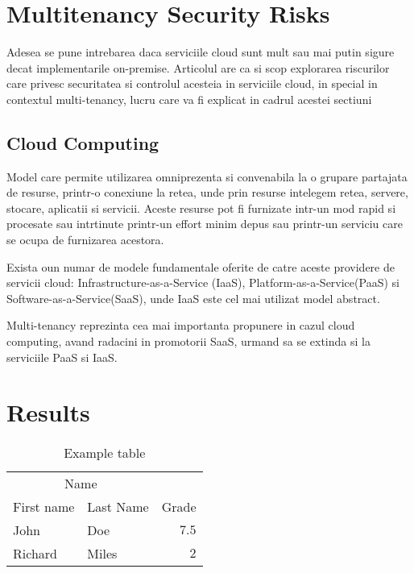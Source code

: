 \documentclass[twoside,twocolumn]{article}
\begin{document}
\begin{enumerate}
\begin{enumerate}
\end{enumerate}
\end{enumerate}

\section{Multitenancy Security Risks}
\par Adesea se pune intrebarea daca serviciile cloud sunt mult sau mai putin sigure decat implementarile on-premise. Articolul \cite{2} are ca si scop explorarea riscurilor care privesc securitatea si controlul acesteia in serviciile cloud, in special in contextul multi-tenancy, lucru care va fi explicat in cadrul acestei sectiuni\\

\subsection{Cloud Computing}
\par Model care permite utilizarea omniprezenta si convenabila la o grupare partajata de resurse, printr-o conexiune la retea, unde prin resurse intelegem retea, servere, stocare, aplicatii si servicii. Aceste resurse pot fi furnizate intr-un mod rapid si procesate sau intrtinute printr-un effort minim depus sau printr-un serviciu care se ocupa de furnizarea acestora. \\
\par Exista oun numar de modele fundamentale oferite de catre aceste providere de servicii cloud: Infrastructure-as-a-Service (IaaS), Platform-as-a-Service(PaaS) si Software-as-a-Service(SaaS), unde IaaS este cel mai utilizat model abstract.\\
\par Multi-tenancy reprezinta cea mai importanta propunere in cazul cloud computing, avand radacini in promotorii SaaS, urmand sa se extinda si la serviciile PaaS si IaaS.\\




\section{Results}

\begin{table}
\caption{Example table}
\centering
\begin{tabular}{llr}
\toprule
\multicolumn{2}{c}{Name} \\
\cmidrule(r){1-2}
First name & Last Name & Grade \\
\midrule
John & Doe & $7.5$ \\
Richard & Miles & $2$ \\
\bottomrule
\end{tabular}
\end{table}
\end{document}
